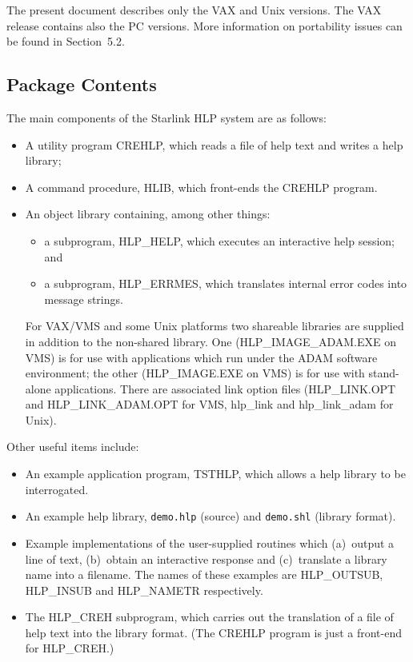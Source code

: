The present document describes only the VAX and Unix versions.  The
VAX release contains also the PC versions.  More information
on portability issues can be found in Section~5.2.

\subsection{Package Contents}
The main components of the Starlink HLP system are as follows:
\begin{itemize}
\item A utility program CREHLP,
which reads a file of help text and writes a help library;
\item A command procedure, HLIB, which front-ends the
CREHLP program.
\item An object library containing, among other things:
   \begin{itemize}
   \item a subprogram, HLP\_HELP, which executes an interactive
   help session; and
   \item a subprogram, HLP\_ERRMES, which translates internal error
   codes into message strings.
   \end{itemize}
For VAX/VMS and some Unix platforms two shareable libraries are supplied
in addition to the non-shared library.  One
(HLP\_IMAGE\_ADAM.EXE on VMS) is for use with applications which run
under the ADAM software environment; the other
(HLP\_IMAGE.EXE on VMS) is for use with stand-alone applications.
There are associated link option files (HLP\_LINK.OPT and HLP\_LINK\_ADAM.OPT
for VMS, hlp\_link and hlp\_link\_adam for Unix).
\end{itemize}
Other useful items include:
\begin{itemize}
\item An example application program, TSTHLP, which allows a help
library to be interrogated.
\item An example help library, {\tt demo.hlp} (source)
and {\tt demo.shl} (library format).
\item Example implementations of the user-supplied routines which
(a)~output a line of text, (b)~obtain an interactive response and
(c)~translate a library name into a filename.  The
names of these examples are HLP\_OUTSUB, HLP\_INSUB and
HLP\_NAMETR respectively.
\item The HLP\_CREH subprogram, which carries out the translation of
a file of help text into the library format.  (The CREHLP program
is just a front-end for HLP\_CREH.)
\end{itemize}
